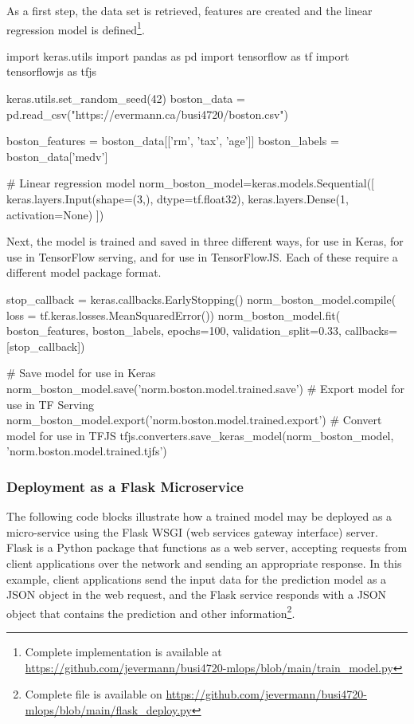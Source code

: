 As a first step, the data set is retrieved, features are created and the linear regression model is defined\footnote{
Complete implementation is available at \url{https://github.com/jevermann/busi4720-mlops/blob/main/train_model.py}}. \\

\begin{samepage}
\begin{pythoncode}
import keras.utils
import pandas as pd
import tensorflow as tf
import tensorflowjs as tfjs

keras.utils.set_random_seed(42)
boston_data = pd.read_csv("https://evermann.ca/busi4720/boston.csv")

boston_features = boston_data[['rm', 'tax', 'age']]
boston_labels = boston_data['medv']

# Linear regression model
norm_boston_model=keras.models.Sequential([
    keras.layers.Input(shape=(3,), dtype=tf.float32),
    keras.layers.Dense(1, activation=None) ])
\end{pythoncode}
\end{samepage}

Next, the model is trained and saved in three different ways, for use in Keras, for use in TensorFlow serving, and for use in TensorFlowJS. Each of these require a different model package format.

\begin{samepage}
\begin{pythoncode}
stop_callback = keras.callbacks.EarlyStopping()
norm_boston_model.compile(
    loss = tf.keras.losses.MeanSquaredError())
norm_boston_model.fit(
    boston_features, boston_labels,
    epochs=100, validation_split=0.33,
    callbacks=[stop_callback])

# Save model for use in Keras
norm_boston_model.save('norm.boston.model.trained.save')
# Export model for use in TF Serving
norm_boston_model.export('norm.boston.model.trained.export')
# Convert model for use in TFJS
tfjs.converters.save_keras_model(norm_boston_model,
    'norm.boston.model.trained.tjfs')
\end{pythoncode}
\end{samepage}

\subsubsection*{Deployment as a Flask Microservice}

The following code blocks illustrate how a trained model may be deployed as a micro-service using the Flask WSGI (web services gateway interface) server. Flask is a Python package that functions as a web server, accepting requests from client applications over the network and sending an appropriate response. In this example, client applications send the input data for the prediction model as a JSON object in the web request, and the Flask service responds with a JSON object that contains the prediction and other information\footnote{Complete file is available on \url{https://github.com/jevermann/busi4720-mlops/blob/main/flask_deploy.py}}.

